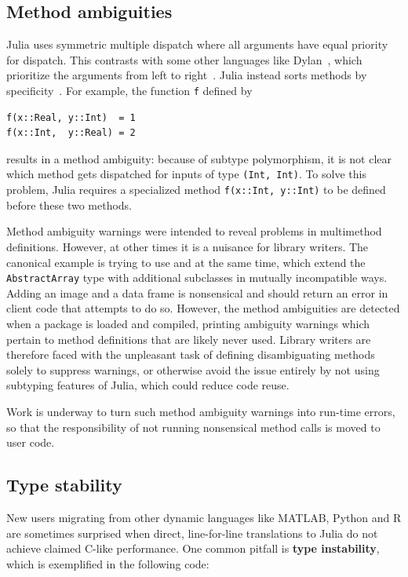\documentclass[10pt, preprint]{sigplanconf}
\begin{document}
\subsection{Method ambiguities}

Julia uses symmetric multiple dispatch where all arguments have equal priority
for dispatch. This contrasts with some other languages like
Dylan~\cite{dylanman}, which
prioritize the arguments from left to right~\cite{Agrawal1991}. Julia instead
sorts methods by specificity~\cite{Bezanson2012}. For example, the function
\verb|f| defined by

\begin{lstlisting}
f(x::Real, y::Int)  = 1
f(x::Int,  y::Real) = 2
\end{lstlisting}
%
results in a method ambiguity: because of subtype polymorphism, it is not clear
which method gets dispatched for inputs of type \verb|(Int, Int)|. To solve
this problem, Julia
requires a specialized method \verb|f(x::Int, y::Int)| to be defined before
these two methods.

Method ambiguity warnings were intended to reveal problems in multimethod
definitions. However, at other times it is a nuisance for library
writers. The canonical example is trying to use  and
 at the same time, which extend the \verb|AbstractArray|
type with additional subclasses in mutually incompatible ways. Adding an image
and a data frame is nonsensical and should return an error in client code that
attempts to do so. However, the method ambiguities are detected when a package
is loaded and compiled, printing ambiguity warnings which pertain to method
definitions that are likely never used.
Library writers are therefore faced with the unpleasant task of defining
disambiguating methods solely to suppress warnings, or otherwise
avoid the issue entirely by not using subtyping features of Julia, which could
reduce code reuse.

Work is underway to turn such method ambiguity warnings into run-time errors,
so that the responsibility of not running nonsensical method calls is moved to
user code.

\subsection{Type stability}

New users migrating from other dynamic languages like MATLAB, Python and R are
sometimes surprised when direct, line-for-line translations to Julia do not
achieve claimed C-like performance.
One common pitfall is \textbf{type instability}, which is exemplified in the following
code:
\end{document}
